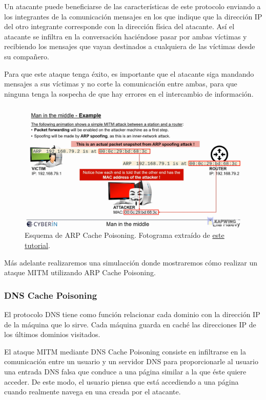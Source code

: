 \documentclass[11pt]{article}
\begin{document}
 Un atacante puede beneficiarse de las características de este protocolo enviando a los integrantes de la comunicación mensajes en los que indique que la dirección IP del otro integrante corresponde con la dirección física del atacante. Así el atacante se infiltra en la conversación haciéndose pasar por ambas víctimas y recibiendo los mensajes que vayan destinados a cualquiera de las víctimas desde su compañero. 
 
 Para que este ataque tenga éxito, es importante que el atacante siga mandando mensajes a sus víctimas y no corte la comunicación entre ambas, para que ninguna tenga la sospecha de que hay errores en el intercambio de información.
 
 \begin{figure}[H]
 	\centering
 	\includegraphics[width=120mm]{images/esquema-arp}
 	\caption{Esquema de ARP Cache Poisoning. Fotograma extraído de \href{https://www.youtube.com/watch?v=fbXu8EX0hsI}{este tutorial}.}
 \end{figure}

	Más adelante realizaremos una simulacción donde mostraremos cómo realizar un ataque MITM utilizando ARP Cache Poisoning.

\subsubsection*{DNS Cache Poisoning}

 El protocolo DNS tiene como función relacionar cada dominio con la dirección IP de la máquina que lo sirve. Cada máquina guarda en caché las direcciones IP de los últimos dominios visitados.
 
 El ataque MITM mediante DNS Cache Poisoning consiste en infiltrarse en la comunicación entre un usuario y un servidor DNS para proporcionarle al usuario una entrada DNS falsa que conduce a una página similar a la que éste quiere acceder. De este modo, el usuario piensa que está accediendo a una página cuando realmente navega en una creada por el atacante.
 
\end{document}
